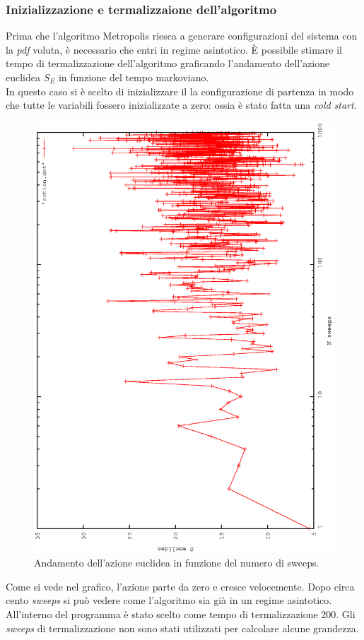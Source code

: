 \subsubsection{Inizializzazione e termalizzaione dell'algoritmo}
Prima che l'algoritmo Metropolis riesca a generare configurazioni del sistema con la \emph{pdf} voluta, è necessario che entri in regime asintotico.
È possibile stimare il tempo di termalizzazione dell'algoritmo graficando l'andamento dell'azione euclidea $S_E$ in funzione del tempo markoviano.\\
In questo caso si è scelto di inizializzare il la configurazione di partenza in modo che tutte le variabili fossero inizializzate a zero: ossia è stato fatta una
\emph{cold start}.
\begin{center}
  \begin{figure}[h]
    \includegraphics[width=0.6\columnwidth,angle = -90]{action_cold.eps}
    \caption{Andamento dell'azione euclidea in funzione del numero di sweeps.}
  \end{figure}
\end{center}
Come si vede nel grafico, l'azione parte da zero e cresce velocemente. Dopo circa cento \emph{sweeps} si può vedere come l'algoritmo sia già in un regime asintotico.
All'interno del programma è stato scelto come tempo di termalizzazione 200. Gli \emph{sweeps} di termalizzazione non sono stati utilizzati per calcolare alcune grandezza.

